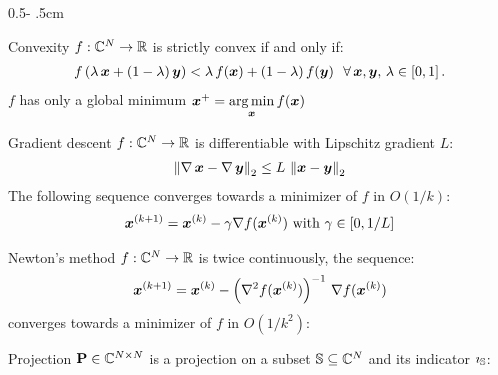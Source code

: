 \documentclass[a4paper]{cookbook}
\begin{document}
\begin{frame}
\begin{columns}[onlytextwidth]
\begin{column}{0.5\textwidth - .5cm}
    
    \begin{block}{Convexity}
    $ f: \mathbb{C}^N \to \mathbb{R} $ is strictly convex if and only if:
    \begin{align*}
        f\left(\lambda\,\boldsymbol{x} + (1-\lambda)\,\boldsymbol{y}) < \lambda\,f(\boldsymbol{x}) + (1-\lambda)\,f(\boldsymbol{y}\right)\,\ \forall\,\boldsymbol{x},\boldsymbol{y}, \, \lambda\in[0,1]\,.
    \end{align*}
    $f$ has only a global minimum $\V{x}^+=\argmin_{\V{x}}  f(\V{x})$
    \end{block}
    \begin{block}{Gradient descent}
    $f:  \mathbb{C}^N \to \mathbb{R} $ is differentiable with Lipschitz gradient $L$:
    \begin{align*}
        \left\Vert \nabla \,\boldsymbol{x} - \nabla \,\boldsymbol{y}\right\Vert_2 \leq L\,\left\Vert \boldsymbol{x} - \boldsymbol{y}\right\Vert_2
    \end{align*}
    The following sequence converges towards a minimizer of $f$ in $O(1/k)$: 
    \begin{align*}
        \boldsymbol{x}^{(k+1)} = \boldsymbol{x}^{(k)} - \gamma \nabla f(\boldsymbol{x}^{(k)})  \text{ with } \gamma\in[0,1/L]
    \end{align*} 
    \end{block}
    
    \begin{block}{Newton's method}
    $f:  \mathbb{C}^N \to \mathbb{R} $ is twice continuously, the sequence:
    \begin{align*}
        \boldsymbol{x}^{(k+1)} = \boldsymbol{x}^{(k)} - \left(\nabla^2 f(\boldsymbol{x}^{(k)})\right)^{-1}\,\nabla f(\boldsymbol{x}^{(k)})  
    \end{align*} 
     converges towards a minimizer of $f$ in $O(1/k^2)$: 
    \end{block}
    
    
    \begin{block}{Projection}
    $\mathbf{P}  \in \mathbb{C}^{N\times N}$  is a projection on a subset $\mathbb{S} \subseteq   \mathbb{C}^{N}$ and its indicator $\imath_{\mathbb{S}}$:
    

\end{block}
\end{column}
\end{columns}
\end{frame}
\end{document}
